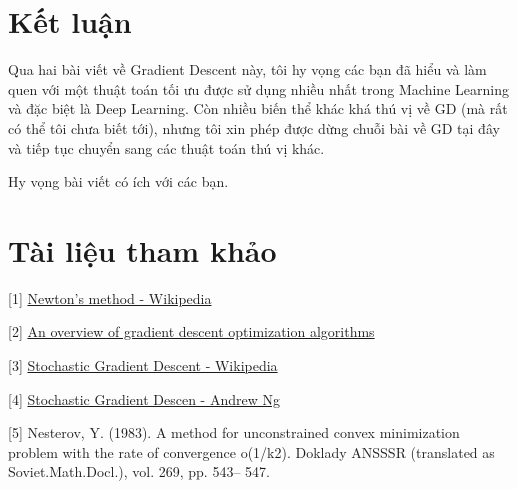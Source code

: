  
 
 
\section{Kết luận}
Qua hai bài viết về Gradient Descent này, tôi hy vọng các bạn đã hiểu và làm quen với một thuật toán tối ưu được sử dụng nhiều nhất trong Machine Learning và đặc biệt là Deep Learning. Còn nhiều biến thể khác khá thú vị về GD (mà rất có thể tôi chưa biết tới), nhưng tôi xin phép được dừng chuỗi bài về GD tại đây và tiếp tục chuyển sang các thuật toán thú vị khác.  
 
Hy vọng bài viết có ích với các bạn. 
 
 
\section{Tài liệu tham khảo}
 
[1] \href{https://en.wikipedia.org/wiki/Newton's_method}{Newton's method - Wikipedia} 
 
[2] \href{http://sebastianruder.com/optimizing-gradient-descent/index.html#stochasticgradientdescent}{An overview of gradient descent optimization algorithms} 
 
[3] \href{https://en.wikipedia.org/wiki/Stochastic_gradient_descent}{Stochastic Gradient Descent - Wikipedia} 
 
[4] \href{https://www.youtube.com/watch?v=UfNU3Vhv5CA}{Stochastic Gradient Descen - Andrew Ng}  
 
[5] Nesterov, Y. (1983). A method for unconstrained convex minimization problem with the rate of convergence o(1/k2). Doklady ANSSSR (translated as Soviet.Math.Docl.), vol. 269, pp. 543– 547. 
